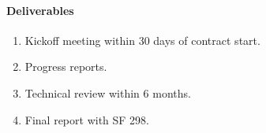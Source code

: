 \documentclass{sbir}
\begin{document}


\paragraph{Deliverables}

\begin{enumerate}[label=\alph*.] 
\vspace{-0.1in}
\item Kickoff meeting within 30 days of contract start.
\item Progress reports.
\item Technical review within 6 months.
\item Final report with SF 298.
\end{enumerate}


\newpage
\clearpage
{}
\end{document}
